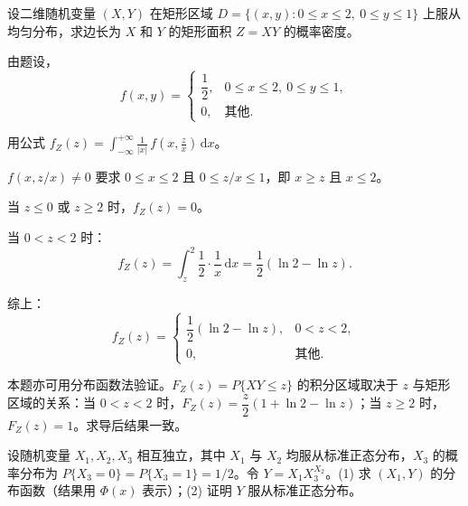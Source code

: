 \documentclass[lang=cn,11pt]{elegantbook}
\begin{document}
\begin{exercise} \label{exer:3-8c}
设二维随机变量 $(X,Y)$ 在矩形区域 $D = \{(x,y) : 0 \leqslant x \leqslant 2,\ 0 \leqslant y \leqslant 1\}$ 上服从均匀分布，求边长为 $X$ 和 $Y$ 的矩形面积 $Z = XY$ 的概率密度。
\end{exercise}

\begin{solution}
由题设，
\[
f(x,y) = \begin{cases} \dfrac{1}{2}, & 0 \leqslant x \leqslant 2,\ 0 \leqslant y \leqslant 1, \\ 0, & \text{其他}. \end{cases}
\]

用公式 $f_Z(z) = \displaystyle\int_{-\infty}^{+\infty}\frac{1}{|x|}\,f\!\left(x, \frac{z}{x}\right)\,\mathrm{d}x$。

$f(x, z/x) \neq 0$ 要求 $0 \leqslant x \leqslant 2$ 且 $0 \leqslant z/x \leqslant 1$，即 $x \geqslant z$ 且 $x \leqslant 2$。

当 $z \leqslant 0$ 或 $z \geqslant 2$ 时，$f_Z(z) = 0$。

当 $0 < z < 2$ 时：
\[
f_Z(z) = \int_z^2 \frac{1}{2} \cdot \frac{1}{x}\,\mathrm{d}x = \frac{1}{2}(\ln 2 - \ln z).
\]

综上：
\[
f_Z(z) = \begin{cases} \dfrac{1}{2}(\ln 2 - \ln z), & 0 < z < 2, \\ 0, & \text{其他}. \end{cases}
\]

\begin{note}
本题亦可用分布函数法验证。$F_Z(z) = P\{XY \leqslant z\}$ 的积分区域取决于 $z$ 与矩形区域的关系：当 $0 < z < 2$ 时，$F_Z(z) = \dfrac{z}{2}(1 + \ln 2 - \ln z)$；当 $z \geqslant 2$ 时，$F_Z(z) = 1$。求导后结果一致。
\end{note}
\end{solution}

\begin{exercise} \label{exer:3-8d}
设随机变量 $X_1, X_2, X_3$ 相互独立，其中 $X_1$ 与 $X_2$ 均服从标准正态分布，$X_3$ 的概率分布为 $P\{X_3 = 0\} = P\{X_3 = 1\} = 1/2$。令 $Y = X_1 X_3^{X_2}$。(1) 求 $(X_1, Y)$ 的分布函数（结果用 $\Phi(x)$ 表示）；(2) 证明 $Y$ 服从标准正态分布。
\end{exercise}
\end{document}
